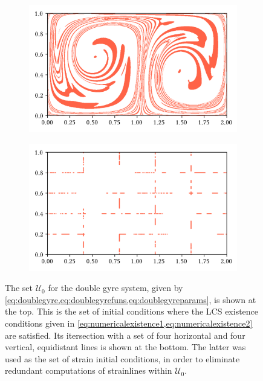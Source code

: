 \begin{figure}[htpb]
    \centering
    \begin{subfigure}{\textwidth}
        \centering
        \includegraphics{figures/domain_figures/u0_dom.png}
    \end{subfigure}

    \begin{subfigure}{\textwidth}
        \centering
        \includegraphics{figures/domain_figures/g0_dom.png}
    \end{subfigure}
    \caption[The set $\mathcal{U}_{0}$ for the double gyre system]{The set
        $\mathcal{U}_{0}$ for the double gyre system, given by
    \cref{eq:doublegyre,eq:doublegyrefuns,eq:doublegyreparams}, is shown at the
    top. This is the set of initial conditions where the LCS existence
    conditions given in \cref{eq:numericalexistence1,eq:numericalexistence2}
    are satisfied.  Its itersection with a set of four horizontal and four
    vertical, equidistant lines is shown at the bottom. The latter was used as
    the set of strain initial conditions, in order to eliminate redundant
    computations of strainlines within $\mathcal{U}_{0}$.}
    \label{fig:u0_domain}
\end{figure}
